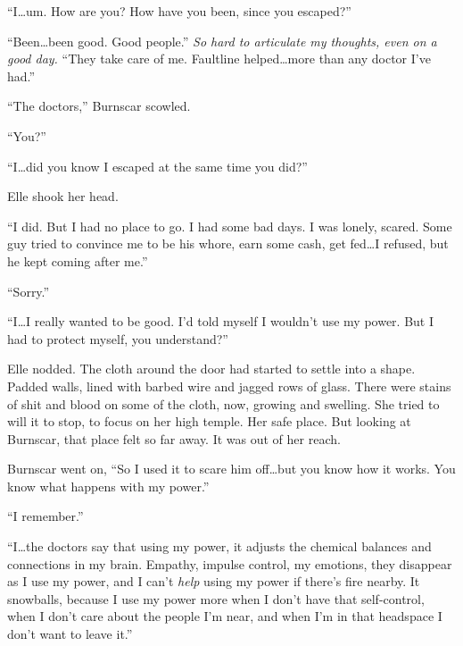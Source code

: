 ``I\ldots um.  How are you?  How have you been, since you escaped?''



``Been\ldots been good.  Good people.''  \emph{So hard to articulate my thoughts, even on a good day.  }``They\emph{ }take care of me.  Faultline helped\ldots more than any doctor I've had.''



``The doctors,'' Burnscar scowled.



``You?''



``I\ldots did you know I escaped at the same time you did?''



Elle shook her head.



``I did.  But I had no place to go.  I had some bad days.  I was lonely, scared.  Some guy tried to convince me to be his whore, earn some cash, get fed\ldots I refused, but he kept coming after me.''



``Sorry.''



``I\ldots I really wanted to be good.  I'd told myself I wouldn't use my power.  But I had to protect myself, you understand?''



Elle nodded.  The cloth around the door had started to settle into a shape.  Padded walls, lined with barbed wire and jagged rows of glass.  There were stains of shit and blood on some of the cloth, now, growing and swelling.  She tried to will it to stop, to focus on her high temple.  Her safe place.  But looking at Burnscar, that place felt so far away.  It was out of her reach.



Burnscar went on, ``So I used it to scare him off\ldots but you know how it works.  You know what happens with my power.''



``I remember.''



``I\ldots the doctors say that using my power, it adjusts the chemical balances and connections in my brain.  Empathy, impulse control, my emotions, they disappear as I use my power, and I can't \emph{help} using my power if there's fire nearby.  It snowballs, because I use my power more when I don't have that self-control, when I don't care about the people I'm near, and when I'm in that headspace I don't want to leave it.''



